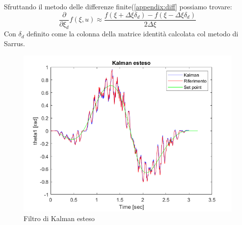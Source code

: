 Sfruttando il metodo delle differenze finite(\ref{appendix:diff} possiamo trovare:
\begin{equation}
\frac{\partial}{\partial \xi_d} f(\xi,u) \approx \frac{f(\xi+\Delta\xi\delta_d)-f(\xi-\Delta\xi\delta_d)}{2\Delta\xi}
\end{equation}
Con $\delta_d$ definito come la colonna della matrice identità calcolata col metodo di Sarrus.
\begin{figure}[ht]
	\begin{center}
		\includegraphics[scale=0.52]{Immagini/Kalman2}
		\caption{Filtro di Kalman esteso}
		\label{fig:kalmanek}
	\end{center}
\end{figure}